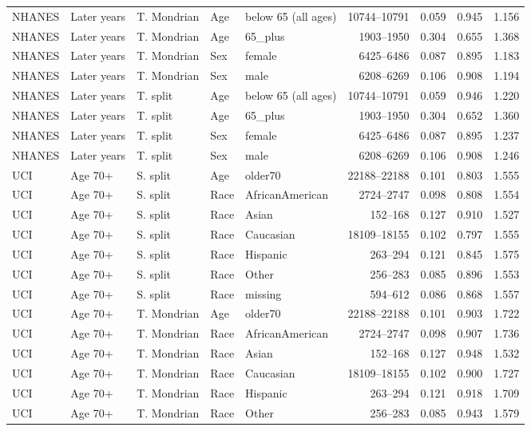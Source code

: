 \begin{longtable}{L{0.9cm}L{1.55cm}L{1.45cm}L{1.1cm}L{1.8cm}r r r r}
NHANES & Later years & T. Mondrian & Age & below 65 (all ages) & 10744--10791 & 0.059 & 0.945 & 1.156 \\
NHANES & Later years & T. Mondrian & Age & 65\_plus & 1903--1950 & 0.304 & 0.655 & 1.368 \\
NHANES & Later years & T. Mondrian & Sex & female & 6425--6486 & 0.087 & 0.895 & 1.183 \\
NHANES & Later years & T. Mondrian & Sex & male & 6208--6269 & 0.106 & 0.908 & 1.194 \\
NHANES & Later years & T. split & Age & below 65 (all ages) & 10744--10791 & 0.059 & 0.946 & 1.220 \\
NHANES & Later years & T. split & Age & 65\_plus & 1903--1950 & 0.304 & 0.652 & 1.360 \\
NHANES & Later years & T. split & Sex & female & 6425--6486 & 0.087 & 0.895 & 1.237 \\
NHANES & Later years & T. split & Sex & male & 6208--6269 & 0.106 & 0.908 & 1.246 \\
UCI & Age 70+ & S. split & Age & older70 & 22188--22188 & 0.101 & 0.803 & 1.555 \\
UCI & Age 70+ & S. split & Race & AfricanAmerican & 2724--2747 & 0.098 & 0.808 & 1.554 \\
UCI & Age 70+ & S. split & Race & Asian & 152--168 & 0.127 & 0.910 & 1.527 \\
UCI & Age 70+ & S. split & Race & Caucasian & 18109--18155 & 0.102 & 0.797 & 1.555 \\
UCI & Age 70+ & S. split & Race & Hispanic & 263--294 & 0.121 & 0.845 & 1.575 \\
UCI & Age 70+ & S. split & Race & Other & 256--283 & 0.085 & 0.896 & 1.553 \\
UCI & Age 70+ & S. split & Race & missing & 594--612 & 0.086 & 0.868 & 1.557 \\
UCI & Age 70+ & T. Mondrian & Age & older70 & 22188--22188 & 0.101 & 0.903 & 1.722 \\
UCI & Age 70+ & T. Mondrian & Race & AfricanAmerican & 2724--2747 & 0.098 & 0.907 & 1.736 \\
UCI & Age 70+ & T. Mondrian & Race & Asian & 152--168 & 0.127 & 0.948 & 1.532 \\
UCI & Age 70+ & T. Mondrian & Race & Caucasian & 18109--18155 & 0.102 & 0.900 & 1.727 \\
UCI & Age 70+ & T. Mondrian & Race & Hispanic & 263--294 & 0.121 & 0.918 & 1.709 \\
UCI & Age 70+ & T. Mondrian & Race & Other & 256--283 & 0.085 & 0.943 & 1.579 \\

\end{longtable}
